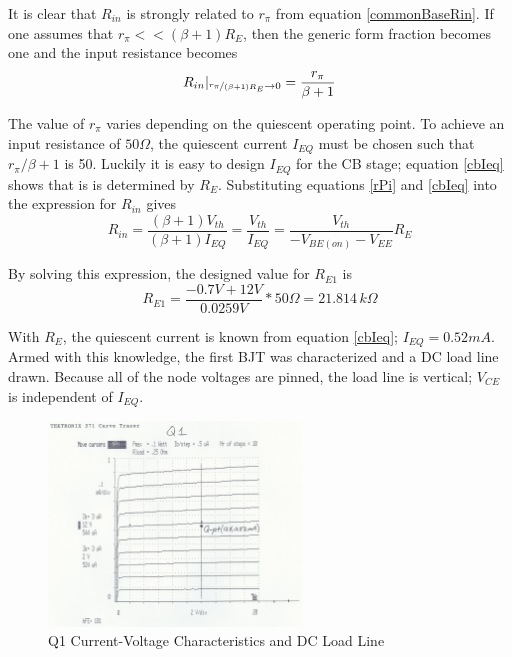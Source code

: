 \documentclass[titlepage, letterpaper, 10.5pt]{article}
\begin{document}
It is clear that $R_{in}$ is strongly related to $r_{\pi}$ from
equation \ref{commonBaseRin}. If one assumes that
$r_{\pi}<<(\beta+1)R_{E}$, then the generic form fraction becomes one
and the input resistance becomes
\begin{equation*}
R_{in}|_{\nicefrac{r_{\pi}}{(\beta+1)R_{E}}\rightarrow 0}
=\frac{r_{\pi}}{\beta+1}
\end{equation*}

The value of $r_{\pi}$ varies depending on the quiescent operating
point. To achieve an input resistance of $50\Omega$, the quiescent
current $I_{EQ}$ must be chosen such that $r_{\pi}/\beta+1$ is 50.
Luckily it is easy to design $I_{EQ}$ for the CB stage; equation
\ref{cbIeq} shows that is is determined by $R_{E}$. Substituting
equations \ref{rPi} and \ref{cbIeq} into the expression for $R_{in}$
gives
\begin{equation*}
R_{in}=\frac{(\beta+1)V_{th}}{(\beta+1)I_{EQ}}=
\frac{V_{th}}{I_{EQ}}=
\frac{V_{th}}{-V_{BE(on)}-V_{EE}}R_{E}
\end{equation*}

By solving this expression, the designed value for $R_{E1}$ is
\begin{equation*}
R_{E1}=\frac{-0.7V+12V}{0.0259V}*50\Omega=21.814\,k\Omega
\end{equation*}

With $R_{E}$, the quiescent current is known from equation
\ref{cbIeq}; $I_{EQ}=0.52mA$. Armed with this knowledge, the first
BJT was characterized and a DC load line drawn. Because all of the
node voltages are pinned, the load line is vertical; $V_{CE}$ is 
independent of $I_{EQ}$.

\begin{figure}[ht]
	\centering
	\includegraphics[width=0.6\textwidth]
		{measurements/q1Characteristics}
	\caption{
		Q1 Current-Voltage Characteristics and DC Load Line
	}
	\label{q1Characteristics}
\end{figure}
\end{document}
